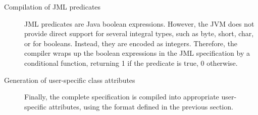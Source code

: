 \begin{description}
\item[Compilation of JML predicates]
JML predicates are Java boolean expressions. However, the JVM does not
provide direct support for several integral types, such as byte,
short, char, or for booleans. Instead, they are encoded as integers.
Therefore, the compiler wraps up the boolean expressions in the JML
specification by a conditional function, returning 1 if the predicate
is true, 0 otherwise.

\item[Generation of user-specific class attributes]
Finally, the complete specification is compiled into appropriate
user-specific attributes, using the format defined in the previous
section. 
    
\end{description}

